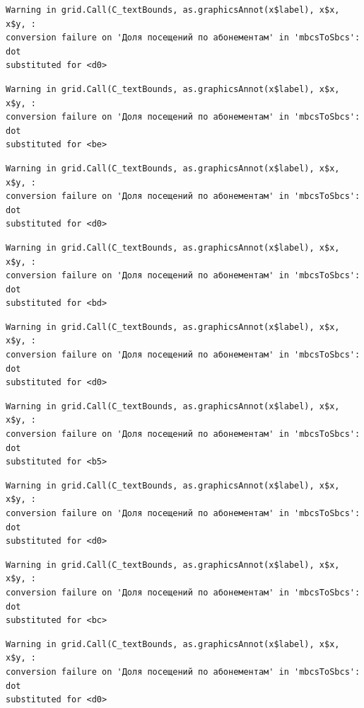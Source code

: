 \documentclass[
  letterpaper,
  DIV=11,
  numbers=noendperiod]{scrartcl}
\begin{document}
\begin{verbatim}
Warning in grid.Call(C_textBounds, as.graphicsAnnot(x$label), x$x, x$y, :
conversion failure on 'Доля посещений по абонементам' in 'mbcsToSbcs': dot
substituted for <d0>
\end{verbatim}

\begin{verbatim}
Warning in grid.Call(C_textBounds, as.graphicsAnnot(x$label), x$x, x$y, :
conversion failure on 'Доля посещений по абонементам' in 'mbcsToSbcs': dot
substituted for <be>
\end{verbatim}

\begin{verbatim}
Warning in grid.Call(C_textBounds, as.graphicsAnnot(x$label), x$x, x$y, :
conversion failure on 'Доля посещений по абонементам' in 'mbcsToSbcs': dot
substituted for <d0>
\end{verbatim}

\begin{verbatim}
Warning in grid.Call(C_textBounds, as.graphicsAnnot(x$label), x$x, x$y, :
conversion failure on 'Доля посещений по абонементам' in 'mbcsToSbcs': dot
substituted for <bd>
\end{verbatim}

\begin{verbatim}
Warning in grid.Call(C_textBounds, as.graphicsAnnot(x$label), x$x, x$y, :
conversion failure on 'Доля посещений по абонементам' in 'mbcsToSbcs': dot
substituted for <d0>
\end{verbatim}

\begin{verbatim}
Warning in grid.Call(C_textBounds, as.graphicsAnnot(x$label), x$x, x$y, :
conversion failure on 'Доля посещений по абонементам' in 'mbcsToSbcs': dot
substituted for <b5>
\end{verbatim}

\begin{verbatim}
Warning in grid.Call(C_textBounds, as.graphicsAnnot(x$label), x$x, x$y, :
conversion failure on 'Доля посещений по абонементам' in 'mbcsToSbcs': dot
substituted for <d0>
\end{verbatim}

\begin{verbatim}
Warning in grid.Call(C_textBounds, as.graphicsAnnot(x$label), x$x, x$y, :
conversion failure on 'Доля посещений по абонементам' in 'mbcsToSbcs': dot
substituted for <bc>
\end{verbatim}

\begin{verbatim}
Warning in grid.Call(C_textBounds, as.graphicsAnnot(x$label), x$x, x$y, :
conversion failure on 'Доля посещений по абонементам' in 'mbcsToSbcs': dot
substituted for <d0>
\end{verbatim}
\end{document}
